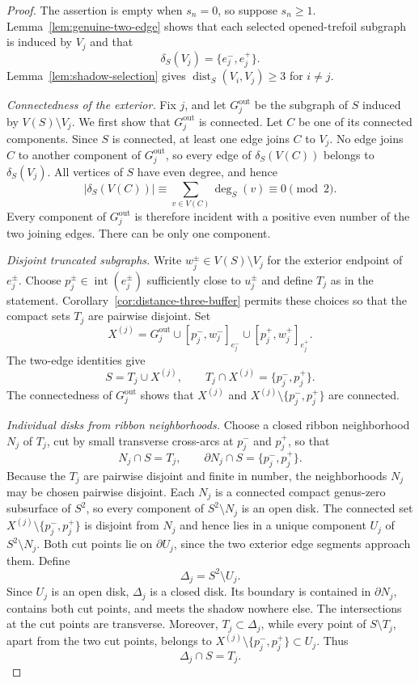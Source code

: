 \documentclass[9pt,twoside]{pnas-new}
\theoremstyle{definition}
\theoremstyle{remark}
\begin{document}
\begin{proof}
The assertion is empty when $s_n=0$, so suppose $s_n\ge1$. Lemma~\ref{lem:genuine-two-edge} shows that each selected opened-trefoil subgraph is induced by $V_j$ and that
\[
 \delta_S(V_j)=\{e_j^-,e_j^+\}.
\]
Lemma~\ref{lem:shadow-selection} gives $\operatorname{dist}_S(V_i,V_j)\ge3$ for $i\ne j$.

\emph{Connectedness of the exterior.}
Fix $j$, and let $G_j^{\mathrm{out}}$ be the subgraph of $S$ induced by $V(S)\setminus V_j$. We first show that $G_j^{\mathrm{out}}$ is connected. Let $C$ be one of its connected components. Since $S$ is connected, at least one edge joins $C$ to $V_j$. No edge joins $C$ to another component of $G_j^{\mathrm{out}}$, so every edge of $\delta_S(V(C))$ belongs to $\delta_S(V_j)$. All vertices of $S$ have even degree, and hence
\[
 \lvert\delta_S(V(C))\rvert
 \equiv \sum_{v\in V(C)}\deg_S(v)
 \equiv0\pmod 2.
\]
Every component of $G_j^{\mathrm{out}}$ is therefore incident with a positive even number of the two joining edges. There can be only one component.

\emph{Disjoint truncated subgraphs.}
Write $w_j^\pm\in V(S)\setminus V_j$ for the exterior endpoint of $e_j^\pm$. Choose $p_j^\pm\in\operatorname{int}(e_j^\pm)$ sufficiently close to $u_j^\pm$ and define $T_j$ as in the statement. Corollary~\ref{cor:distance-three-buffer} permits these choices so that the compact sets $T_j$ are pairwise disjoint. Set
\[
 X^{(j)}=G_j^{\mathrm{out}}
 \cup[p_j^-,w_j^-]_{e_j^-}
 \cup[p_j^+,w_j^+]_{e_j^+}.
\]
The two-edge identities give
\[
 S=T_j\cup X^{(j)},
 \qquad
 T_j\cap X^{(j)}=\{p_j^-,p_j^+\}.
\]
The connectedness of $G_j^{\mathrm{out}}$ shows that $X^{(j)}$ and $X^{(j)}\setminus\{p_j^-,p_j^+\}$ are connected.

\emph{Individual disks from ribbon neighborhoods.}
Choose a closed ribbon neighborhood $N_j$ of $T_j$, cut by small transverse cross-arcs at $p_j^-$ and $p_j^+$, so that
\[
 N_j\cap S=T_j,
 \qquad
 \partial N_j\cap S=\{p_j^-,p_j^+\}.
\]
Because the $T_j$ are pairwise disjoint and finite in number, the neighborhoods $N_j$ may be chosen pairwise disjoint. Each $N_j$ is a connected compact genus-zero subsurface of $S^2$, so every component of $S^2\setminus N_j$ is an open disk. The connected set $X^{(j)}\setminus\{p_j^-,p_j^+\}$ is disjoint from $N_j$ and hence lies in a unique component $U_j$ of $S^2\setminus N_j$. Both cut points lie on $\partial U_j$, since the two exterior edge segments approach them. Define
\[
 \Delta_j=S^2\setminus U_j.
\]
Since $U_j$ is an open disk, $\Delta_j$ is a closed disk. Its boundary is contained in $\partial N_j$, contains both cut points, and meets the shadow nowhere else. The intersections at the cut points are transverse. Moreover, $T_j\subset\Delta_j$, while every point of $S\setminus T_j$, apart from the two cut points, belongs to $X^{(j)}\setminus\{p_j^-,p_j^+\}\subset U_j$. Thus
\[
 \Delta_j\cap S=T_j.
\]


\end{proof}
\end{document}
